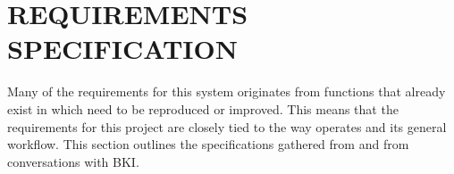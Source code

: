 \chapter{REQUIREMENTS SPECIFICATION}
\label{chap:requirements_spec}


Many of the requirements for this system originates from functions that already
exist in \bhtb{} which need to be reproduced or improved. This means that the
requirements for this project are closely tied to the way \bhtb{} operates and
its general workflow. This section outlines the specifications gathered
from \bhtb{} and from conversations with BKI.




